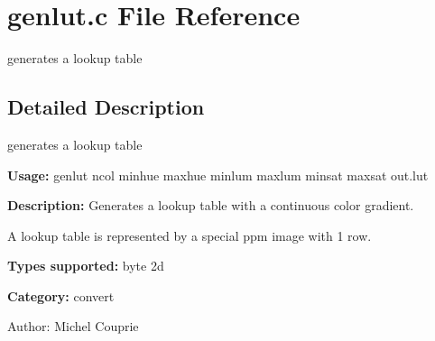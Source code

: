 \section{genlut.c File Reference}
\label{genlut_8c}
generates a lookup table  




\label{_details}
\subsection{Detailed Description}
generates a lookup table 

{\bf Usage:} genlut ncol minhue maxhue minlum maxlum minsat maxsat out.lut

{\bf Description:} Generates a lookup table with a continuous color gradient.

A lookup table is represented by a special ppm image with 1 row.

{\bf Types supported:} byte 2d

{\bf Category:} convert

\begin{Desc}
\item[Author:]Michel Couprie \end{Desc}
